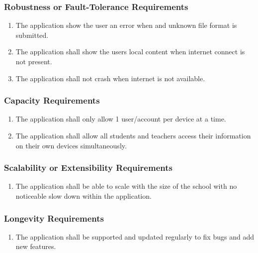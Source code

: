 \documentclass[]{article}
\begin{document}
\subsubsection{Robustness or Fault-Tolerance Requirements}
\label{ssub:robustness_or_fault_tolerance_requirements}
\begin{enumerate}[{PR}1. ]
	\item The application show the user an error when and unknown file format is
submitted.
	\item The application shall show the users local content when internet connect
is not present.
	\item The application shall not crash when internet is not available.
\end{enumerate}

\subsubsection{Capacity Requirements}
\label{ssub:capacity_requirements}
\begin{enumerate}[{PR}1. ]
	\item The application shall only allow 1 user/account per device at a time.
	\item The application shall allow all students and teachers access their
information on their own devices simultaneously.
\end{enumerate}

\subsubsection{Scalability or Extensibility Requirements}
\label{ssub:scalability_or_extensibility_requirements}
\begin{enumerate}[{PR}1. ]
	\item The application shall be able to scale with the size of the school with
no noticeable slow down within the application.
\end{enumerate}

\subsubsection{Longevity Requirements}
\label{ssub:longevity_requirements}
\begin{enumerate}[{PR}1. ]
	\item The application shall be supported and updated regularly to fix bugs and
add new features.
\end{enumerate}
\end{document}
